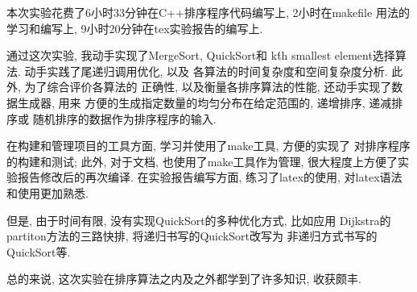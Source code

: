 \label{ssub:实验心得}
本次实验花费了6小时33分钟在C++排序程序代码编写上, 2小时在makefile
用法的学习和编写上, 9小时20分钟在tex实验报告的编写上.\par

通过这次实验, 我动手实现了MergeSort, QuickSort和
k\'th smallest element选择算法. 动手实践了尾递归调用优化, 以及
各算法的时间复杂度和空间复杂度分析. 此外, 为了综合评价各算法的
正确性, 以及衡量各排序算法的性能, 还动手实现了数据生成器, 用来
方便的生成指定数量的均匀分布在给定范围的, 递增排序, 递减排序或
随机排序的数据作为排序程序的输入.\par

在构建和管理项目的工具方面, 学习并使用了make工具, 方便的实现了
对排序程序的构建和测试; 此外, 对于文档, 也使用了make工具作为管理,
很大程度上方便了实验报告修改后的再次编译. 在实验报告编写方面,
练习了latex的使用, 对latex语法和使用更加熟悉.\par

但是, 由于时间有限, 没有实现QuickSort的多种优化方式, 比如应用
Dijkstra的partiton方法的三路快排, 将递归书写的QuickSort改写为
非递归方式书写的QuickSort等.\par

总的来说, 这次实验在排序算法之内及之外都学到了许多知识, 收获颇丰.
